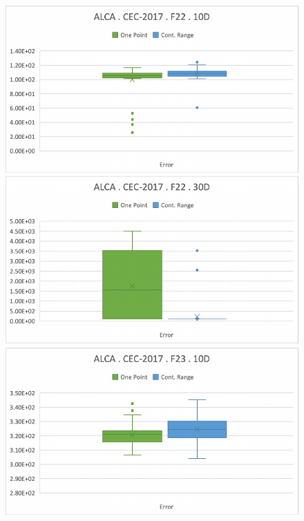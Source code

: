 \documentclass[graybox]{svmult}
\begin{document}
\begin{figure}[!ht]
\begin{minipage}[h]{0.49\linewidth}
            \includegraphics[width=1\linewidth]{img/fig_experiment_F22x10D.pdf} 
        \end{minipage}
        \hfill
        \begin{minipage}[h]{0.49\linewidth}
            \includegraphics[width=1\linewidth]{img/fig_experiment_F22x30D.pdf} 
        \end{minipage}
        \vfill
        \vspace{0.05 cm}
        \begin{minipage}[h]{0.49\linewidth}
            \includegraphics[width=1\linewidth]{img/fig_experiment_F23x10D.pdf} 

\end{minipage}
\end{figure}
\end{document}
